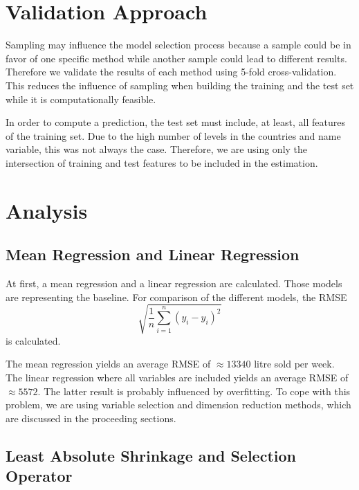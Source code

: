 \documentclass[11pt,]{article}
\begin{document}
\hypertarget{validation-approach}{%
\section{\texorpdfstring{Validation Approach
\label{chap:val}}{Validation Approach }}\label{validation-approach}}

Sampling may influence the model selection process because a sample
could be in favor of one specific method while another sample could lead
to different results. Therefore we validate the results of each method
using 5-fold cross-validation. This reduces the influence of sampling
when building the training and the test set while it is computationally
feasible.

In order to compute a prediction, the test set must include, at least,
all features of the training set. Due to the high number of levels in
the countries and name variable, this was not always the case.
Therefore, we are using only the intersection of training and test
features to be included in the estimation.

\hypertarget{analysis}{%
\section{\texorpdfstring{Analysis
\label{chap:anal}}{Analysis }}\label{analysis}}

\hypertarget{mean-regression-and-linear-regression}{%
\subsection{Mean Regression and Linear
Regression}\label{mean-regression-and-linear-regression}}

At first, a mean regression and a linear regression are calculated.
Those models are representing the baseline. For comparison of the
different models, the \ac{RMSE}
\[\sqrt{\frac{1}{n}\sum_{i = 1}^{n}\left(y_i-\hat{y}_i\right)^2}\] is
calculated.

The mean regression yields an average \ac{RMSE} of \(\approx 13340\)
litre sold per week. The linear regression where all variables are
included yields an average \ac{RMSE} of \(\approx 5572\). The latter
result is probably influenced by overfitting. To cope with this problem,
we are using variable selection and dimension reduction methods, which
are discussed in the proceeding sections.

\hypertarget{least-absolute-shrinkage-and-selection-operator}{%
\subsection{Least Absolute Shrinkage and Selection
Operator}\label{least-absolute-shrinkage-and-selection-operator}}
\end{document}
